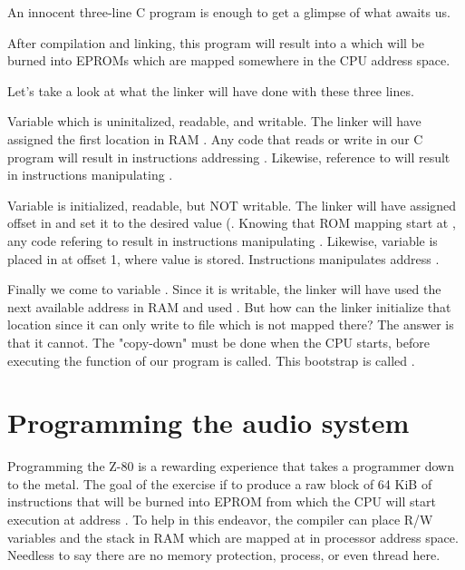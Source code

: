 An innocent three-line C program is enough to get a glimpse of what awaits us.



After compilation and linking, this program will result into a  which will be burned into EPROMs which are mapped somewhere in the CPU address space.


Let's take a look at what the linker will have done with these three lines.

Variable  which is uninitalized, readable, and writable. The linker will have assigned the first location in RAM . Any code that reads or write  in our C program will result in instructions addressing . Likewise, reference to  will result in instructions manipulating .

Variable   is initialized, readable, but NOT writable. The linker will have assigned offset  in  and set it to the desired value (. Knowing that ROM mapping start at , any code refering to  result in instructions manipulating . Likewise, variable  is placed in  at offset 1, where value  is stored. Instructions manipulates address .

Finally we come to variable . Since it is writable, the linker will have used the next available address in RAM and used . But how can the linker initialize that location since it can only write to file  which is not mapped there? The answer is that it cannot. The "copy-down" must be done when the CPU starts, before executing the  function of our program is called. This bootstrap is called .

\section{Programming the audio system}
Programming the Z-80 is a rewarding experience that takes a programmer down to the metal. The goal of the exercise if to produce a raw block of 64 KiB of instructions that will be burned into EPROM from which the CPU will start execution at address . To help in this endeavor, the compiler can place R/W variables and the stack in RAM which are mapped at  in processor address space. Needless to say there are no memory protection, process, or even thread here.

